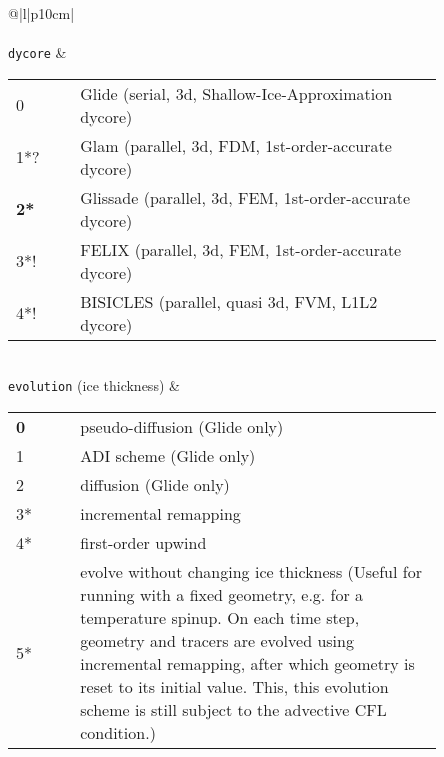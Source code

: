 \begin{center}
\begin{supertabular*}{\textwidth}{@{\extracolsep{\fill}}|l|p{10cm}|}
    \hline
    \hline
    \hline
    \\
    \hline
    \\
    \hline
    \texttt{dycore} & 
    \begin{tabular}[t]{lp{0.85\linewidth}}
      0 & Glide (serial, 3d, Shallow-Ice-Approximation dycore) \\
      1*? & Glam (parallel, 3d, FDM, 1st-order-accurate dycore)  \\
      {\bf 2*} & Glissade (parallel, 3d, FEM, 1st-order-accurate dycore)  \\
      3*! & FELIX (parallel, 3d, FEM, 1st-order-accurate dycore)  \\
      4*! & BISICLES (parallel, quasi 3d, FVM, L1L2 dycore)  \\
    \end{tabular}\\
    \texttt{evolution} (ice thickness) & 
    \begin{tabular}[t]{lp{0.85\linewidth}}
      {\bf 0} & pseudo-diffusion (Glide only)\\
      1 & ADI scheme  (Glide only)\\
      2 & diffusion (Glide only)\\
      3* & incremental remapping \\
      4* & first-order upwind  \\
      5* & evolve without changing ice thickness (Useful for running with a fixed geometry, e.g. for a temperature spinup. On each time step, geometry and tracers are evolved using incremental remapping, after which geometry is reset to its initial value. This, this evolution scheme is still subject to the advective CFL condition.)\\
    \end{tabular}\\

\end{supertabular*}
\end{center}
